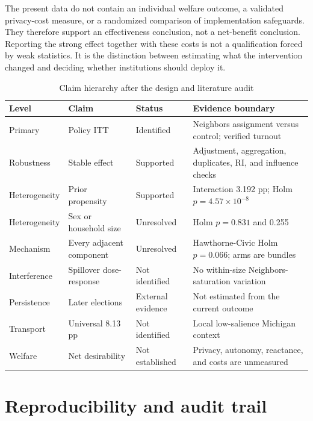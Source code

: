 \documentclass[a4paper,12pt]{article}
\begin{document}
The present data do not contain an individual welfare outcome, a validated privacy-cost measure, or a randomized comparison of implementation safeguards. They therefore support an effectiveness conclusion, not a net-benefit conclusion. Reporting the strong effect together with these costs is not a qualification forced by weak statistics. It is the distinction between estimating what the intervention changed and deciding whether institutions should deploy it.

\begin{table}[H]
\centering
\caption{Claim hierarchy after the design and literature audit}
\label{tab:claims}
\footnotesize
\setlength{\tabcolsep}{4pt}
\begin{tabularx}{0.98\textwidth}{>{\raggedright\arraybackslash}p{2.55cm} >{\raggedright\arraybackslash}p{2.65cm} >{\raggedright\arraybackslash}p{2.2cm} >{\raggedright\arraybackslash}X}
\toprule
Level & Claim & Status & Evidence boundary \\
\midrule
Primary & Policy ITT & Identified & Neighbors assignment versus control; verified turnout \\
Robustness & Stable effect & Supported & Adjustment, aggregation, duplicates, RI, and influence checks \\
Heterogeneity & Prior propensity & Supported & Interaction 3.192 pp; Holm $p=4.57\times10^{-8}$ \\
Heterogeneity & Sex or household size & Unresolved & Holm $p=0.831$ and 0.255 \\
Mechanism & Every adjacent component & Unresolved & Hawthorne-Civic Holm $p=0.066$; arms are bundles \\
Interference & Spillover dose-response & Not identified & No within-size Neighbors-saturation variation \\
Persistence & Later elections & External evidence & Not estimated from the current outcome \\
Transport & Universal 8.13 pp & Not identified & Local low-salience Michigan context \\
Welfare & Net desirability & Not established & Privacy, autonomy, reactance, and costs are unmeasured \\
\bottomrule
\end{tabularx}
\end{table}

\section{Reproducibility and audit trail}
\end{document}
